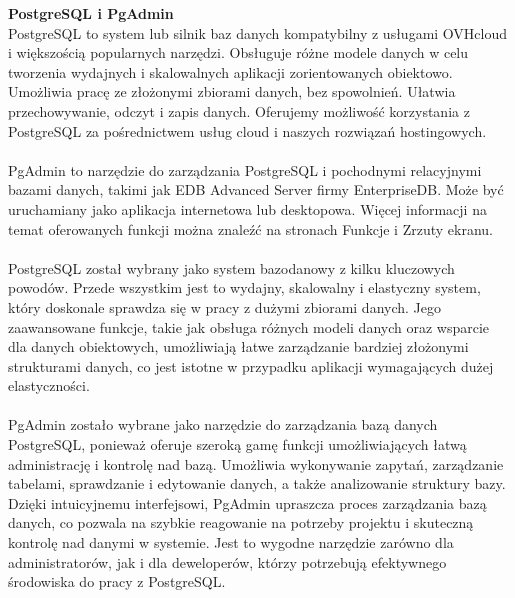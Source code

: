 \documentclass[12pt,a4paper]{article}
\begin{document}
\noindent \textbf{PostgreSQL i PgAdmin}\\
PostgreSQL to system lub silnik baz danych kompatybilny z usługami OVHcloud i większością popularnych narzędzi. Obsługuje różne modele danych w celu tworzenia wydajnych i skalowalnych aplikacji zorientowanych obiektowo. Umożliwia pracę ze złożonymi zbiorami danych, bez spowolnień. Ułatwia przechowywanie, odczyt i zapis danych. Oferujemy możliwość korzystania z PostgreSQL za pośrednictwem usług cloud i naszych rozwiązań hostingowych.
\\\\
PgAdmin to narzędzie do zarządzania PostgreSQL i pochodnymi relacyjnymi bazami danych, takimi jak EDB Advanced Server firmy EnterpriseDB. Może być uruchamiany jako aplikacja internetowa lub desktopowa. Więcej informacji na temat oferowanych funkcji można znaleźć na stronach Funkcje i Zrzuty ekranu.
\\\\
PostgreSQL został wybrany jako system bazodanowy z kilku kluczowych powodów. Przede wszystkim jest to wydajny, skalowalny i elastyczny system, który doskonale sprawdza się w pracy z dużymi zbiorami danych. Jego zaawansowane funkcje, takie jak obsługa różnych modeli danych oraz wsparcie dla danych obiektowych, umożliwiają łatwe zarządzanie bardziej złożonymi strukturami danych, co jest istotne w przypadku aplikacji wymagających dużej elastyczności.
\\\\
PgAdmin zostało wybrane jako narzędzie do zarządzania bazą danych PostgreSQL, ponieważ oferuje szeroką gamę funkcji umożliwiających łatwą administrację i kontrolę nad bazą. Umożliwia wykonywanie zapytań, zarządzanie tabelami, sprawdzanie i edytowanie danych, a także analizowanie struktury bazy. Dzięki intuicyjnemu interfejsowi, PgAdmin upraszcza proces zarządzania bazą danych, co pozwala na szybkie reagowanie na potrzeby projektu i skuteczną kontrolę nad danymi w systemie. Jest to wygodne narzędzie zarówno dla administratorów, jak i dla deweloperów, którzy potrzebują efektywnego środowiska do pracy z PostgreSQL.

\newpage
\end{document}
